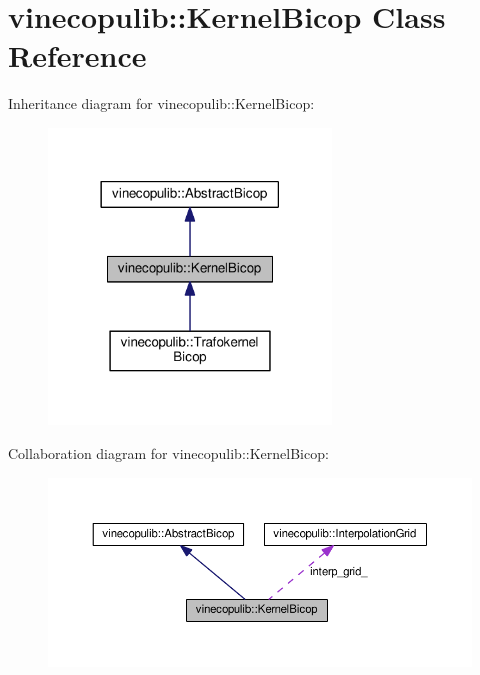 \hypertarget{classvinecopulib_1_1_kernel_bicop}{}\section{vinecopulib\+:\+:Kernel\+Bicop Class Reference}
\label{classvinecopulib_1_1_kernel_bicop}


Inheritance diagram for vinecopulib\+:\+:Kernel\+Bicop\+:\nopagebreak
\begin{figure}[H]
\begin{center}
\leavevmode
\includegraphics[width=213pt]{classvinecopulib_1_1_kernel_bicop__inherit__graph}
\end{center}
\end{figure}


Collaboration diagram for vinecopulib\+:\+:Kernel\+Bicop\+:\nopagebreak
\begin{figure}[H]
\begin{center}
\leavevmode
\includegraphics[width=350pt]{classvinecopulib_1_1_kernel_bicop__coll__graph}
\end{center}
\end{figure}
